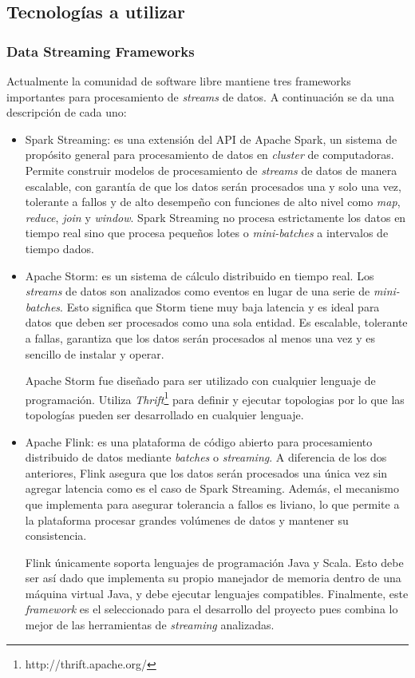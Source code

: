 \documentclass[a4paper,10pt, oneside]{article}
\begin{document}
\subsection{Tecnologías a utilizar}
\subsubsection*{Data Streaming Frameworks}
Actualmente la comunidad de software libre mantiene tres frameworks importantes para procesamiento de \textit{streams} de datos. A continuación se da una descripción de cada uno:
\begin{itemize}
	\item Spark Streaming: es una extensión del API de Apache Spark, un sistema de propósito general para procesamiento de datos en \textit{cluster} de computadoras. Permite construir modelos de procesamiento de \textit{streams} de datos de manera escalable, con garantía de que los datos serán procesados una y solo una vez, tolerante a fallos y de alto desempeño con funciones de alto nivel como \textit{map}, \textit{reduce}, \textit{join} y \textit{window}. Spark Streaming no procesa estrictamente los datos en tiempo real sino que procesa pequeños lotes o \textit{mini-batches} a intervalos de tiempo dados.
	\item Apache Storm: es un sistema de cálculo distribuido en tiempo real. Los \textit{streams} de datos son analizados como eventos en lugar de una serie de \textit{mini-batches}. Esto significa que Storm tiene muy baja latencia y es ideal para datos que deben ser procesados como una sola entidad. Es escalable, tolerante a fallas, garantiza que los datos serán procesados al menos una vez y es sencillo de instalar y operar.\par
	Apache Storm fue diseñado para ser utilizado con cualquier lenguaje de programación. Utiliza  \textit{Thrift}\footnote{http://thrift.apache.org/} para definir y ejecutar topologias por lo que las topologías pueden ser desarrollado en cualquier lenguaje.
	\item Apache Flink: es una plataforma de código abierto para procesamiento distribuido de datos mediante \textit{batches} o \textit{streaming}. A diferencia de los dos anteriores, Flink asegura que los datos serán procesados una única vez sin agregar latencia como es el caso de Spark Streaming. Además, el mecanismo que implementa para asegurar tolerancia a fallos es liviano, lo que permite a la plataforma procesar grandes volúmenes de datos y mantener su consistencia.
	\par Flink únicamente soporta lenguajes de programación Java y Scala. Esto debe ser así dado que implementa su propio manejador de memoria dentro de una máquina virtual Java, y debe ejecutar lenguajes compatibles. Finalmente, este \textit{framework} es el seleccionado para el desarrollo del proyecto pues combina lo mejor de las herramientas de \textit{streaming} analizadas.
	
	
\end{itemize}
\end{document}
